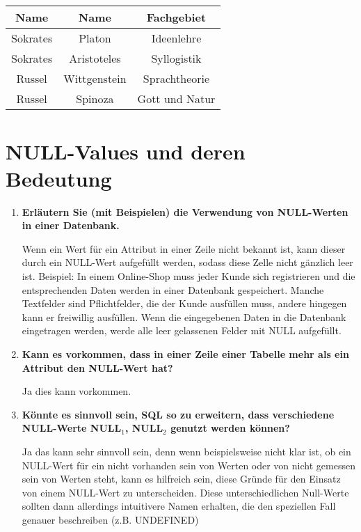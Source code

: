 \documentclass{scrartcl}
\begin{document}
\subsection{}
\begin{tabular}{c|c|c}
    Name & Name & Fachgebiet \\
    \hline
    \hline 
    Sokrates & Platon & Ideenlehre \\
    Sokrates & Aristoteles & Syllogistik \\
    Russel & Wittgenstein & Sprachtheorie \\ 
    Russel & Spinoza & Gott und Natur \\
\end{tabular}
\section{NULL-Values und deren Bedeutung}
\begin{enumerate}
    \item \textbf{Erläutern Sie (mit Beispielen) die Verwendung von NULL-Werten in einer Datenbank.}
    
    Wenn ein Wert für ein Attribut in einer Zeile nicht bekannt ist, kann dieser durch ein NULL-Wert aufgefüllt werden, sodass diese Zelle nicht gänzlich leer ist. Beispiel: In einem Online-Shop muss jeder Kunde sich registrieren und die entsprechenden Daten werden in einer Datenbank gespeichert. Manche Textfelder sind Pflichtfelder, die der Kunde ausfüllen muss, andere hingegen kann er freiwillig ausfüllen. Wenn die eingegebenen Daten in die Datenbank eingetragen werden, werde alle leer gelassenen Felder mit NULL aufgefüllt. 
    \item \textbf{Kann es vorkommen, dass in einer Zeile einer Tabelle mehr als ein Attribut den NULL-Wert hat?}

    Ja dies kann vorkommen. 
    \item \textbf{Könnte es sinnvoll sein, SQL so zu erweitern, dass verschiedene NULL-Werte NULL$_1$, NULL$_2$ genutzt werden können?}

    Ja das kann sehr sinnvoll sein, denn wenn beispielsweise nicht klar ist, ob ein NULL-Wert für ein nicht vorhanden sein von Werten oder von nicht gemessen sein von Werten steht, kann es hilfreich sein, diese Gründe für den Einsatz von einem NULL-Wert zu unterscheiden. Diese unterschiedlichen Null-Werte sollten dann allerdings intuitivere Namen erhalten, die den speziellen Fall genauer beschreiben (z.B. UNDEFINED)
\end{enumerate}
\end{document}
